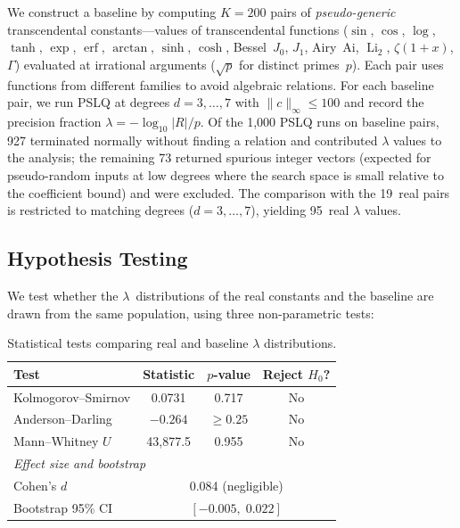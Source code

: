 \documentclass[11pt]{amsart}
\theoremstyle{remark}
\newcommand{\norm}[1]{\lVert #1 \rVert}
\begin{document}
We construct a baseline by computing $K = 200$ pairs of
\emph{pseudo-generic} transcendental constants---values of
transcendental functions ($\sin$, $\cos$, $\log$, $\tanh$, $\exp$,
$\operatorname{erf}$, $\operatorname{arctan}$, $\sinh$, $\cosh$,
Bessel~$J_0$, $J_1$, Airy~Ai, $\operatorname{Li}_2$, $\zeta(1+x)$,
$\Gamma$) evaluated at irrational arguments ($\sqrt{p}$ for
distinct primes~$p$). Each pair uses functions from different
families to avoid algebraic relations.
For each baseline pair, we run PSLQ at degrees $d = 3, \ldots, 7$
with $\norm{c}_\infty \leq 100$ and record the precision fraction
$\lambda = -\log_{10}|R| / p$.
Of the 1{,}000 PSLQ runs on baseline pairs, 927 terminated normally
without finding a relation and contributed $\lambda$ values to the
analysis; the remaining 73 returned spurious integer vectors
(expected for pseudo-random inputs at low degrees where the search
space is small relative to the coefficient bound) and were excluded.
The comparison with the 19~real pairs is restricted to matching
degrees ($d = 3, \ldots, 7$), yielding 95~real $\lambda$ values.

\subsection{Hypothesis Testing}\label{ssec:hypothesis}

We test whether the $\lambda$~distributions of the real constants and the
baseline are drawn from the same population, using three non-parametric tests:

\begin{table}[htbp]
  \centering
  \caption{Statistical tests comparing real and baseline $\lambda$ distributions.}
  \label{tab:stat-tests}
  \begin{tabular}{lccc}
    \toprule
    Test & Statistic & $p$-value & Reject $H_0$? \\
    \midrule
    Kolmogorov--Smirnov & 0.0731 & 0.717 & No \\
    Anderson--Darling & $-0.264$ & $\geq 0.25$ & No \\
    Mann--Whitney $U$ & 43{,}877.5 & 0.955 & No \\
    \midrule
    \multicolumn{4}{l}{\textit{Effect size and bootstrap}} \\
    Cohen's $d$ & \multicolumn{3}{c}{0.084 (negligible)} \\
    Bootstrap 95\% CI & \multicolumn{3}{c}{$[-0.005,\; 0.022]$} \\
    \bottomrule
  \end{tabular}
\end{table}
\end{document}
